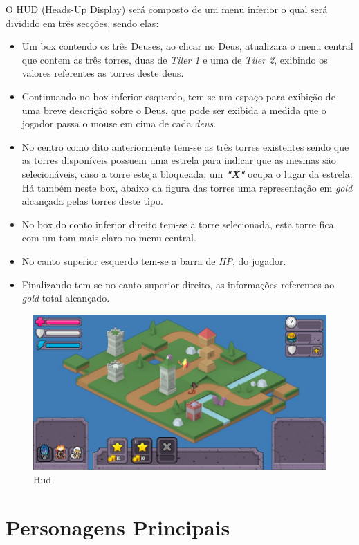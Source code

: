 \documentclass[11pt]{article} %
\begin{document}
O HUD (Heads-Up Display) será composto de um menu inferior o qual será dividido em três secções, sendo elas:
\begin{itemize}
\item Um box contendo os três Deuses, ao clicar no Deus, atualizara o menu central que contem as três torres, duas de \textit{Tiler 1} e uma de \textit{Tiler 2}, exibindo os valores referentes as torres deste deus.
\item Continuando no box inferior esquerdo, tem-se um espaço para exibição de uma breve descrição sobre o Deus, que pode ser exibida a medida que o jogador passa o mouse em cima de cada \textit{deus}.
\item No centro como dito anteriormente tem-se as três torres existentes sendo que as torres disponíveis possuem uma estrela para indicar que as mesmas são selecionáveis, caso a torre esteja bloqueada, um \textit{\textbf{"X"}} ocupa o lugar da estrela. Há também neste box, abaixo da figura das torres uma representação em \textit{gold} alcançada pelas torres deste tipo.
\item No box do conto inferior direito tem-se a torre selecionada, esta torre fica com um tom mais claro no menu central.
\item No canto superior esquerdo tem-se a barra de \textit{HP}, do jogador.
\item Finalizando tem-se no canto superior direito, as informações referentes ao \textit{gold} total alcançado.
\end{itemize}

\begin{figure}[!htp]
\centering
\includegraphics[scale=0.4]{res/gameplay.jpg}
\caption{Hud}
\label{HUD}
\end{figure}

\newpage

\section{Personagens Principais}
\end{document}
